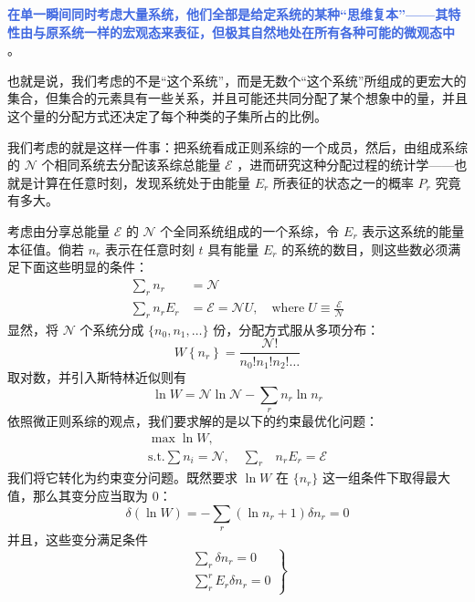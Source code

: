 \textcolor{RoyalBlue}{\textbf{\kaishu 在单一瞬间同时考虑大量系统，他们全部是给定系统的某种“思维复本”——其特性由与原系统一样的宏观态来表征，但极其自然地处在所有各种可能的微观态中}} \cite{Pathria}。

也就是说，我们考虑的不是“这个系统”，而是无数个“这个系统”所组成的更宏大的集合，但集合的元素具有一些关系，并且可能还共同分配了某个想象中的量，并且这个量的分配方式还决定了每个种类的子集所占的比例。

我们考虑的就是这样一件事：把系统看成正则系综的一个成员，然后，由组成系综的 $\mathcal{N}$ 个相同系统去分配该系综总能量 $\mathcal{E}$ ，进而研究这种分配过程的统计学——也就是计算在任意时刻，发现系统处于由能量 $E_r$ 所表征的状态之一的概率 $P_r$ 究竟有多大。

考虑由分享总能量 $\mathcal{E}$ 的 $\mathcal{N}$ 个全同系统组成的一个系综，令 $E_r$ 表示这系统的能量本征值。倘若 $n_r$ 表示在任意时刻 $t$ 具有能量 $E_r$ 的系统的数目，则这些数必须满足下面这些明显的条件：
\begin{align}
    \sum_r n_r&=\mathcal{N} \\
    \sum_r n_r E_r&=\mathcal{E}=\mathcal{N} U, \quad\text{where}\; U \equiv \frac{\mathcal{E}}{\mathcal{N}}  
\end{align}
显然，将 $\mathcal{N}$ 个系统分成 $\{n_0,n_1,\dots\}$ 份，分配方式服从多项分布：
\begin{equation}
    W\left\{n_r\right\}=\frac{\mathcal{N} !}{n_{0} ! n_{1} ! n_{2} ! \ldots}
\end{equation}
取对数，并引入斯特林近似则有
\begin{equation}
    \ln W=\mathcal{N} \ln \mathcal{N}-\sum_r n_r \ln n_r
\end{equation}
依照微正则系综的观点，我们要求解的是以下的约束最优化问题：
\begin{equation}\label{equ:optimizeIII}
    \begin{split}
        \max \ln W,&\\
        \text{s.t.}\sum n_i = \mathcal{N},\quad\sum_r &n_r E_r=\mathcal{E}
    \end{split}
\end{equation}
我们将它转化为约束变分问题。既然要求 $\ln W$ 在 $\{n_r\}$ 这一组条件下取得最大值，那么其变分应当取为 $0$：
\[
    \delta(\ln W)=-\sum_r\left(\ln n_r+1\right) \delta n_r = 0
\]
并且，这些变分满足条件
\[
    \left.\begin{array}{l}
        \sum_r \delta n_r=0 \\
        \sum_r^r E_r \delta n_r=0
        \end{array}\right\}
\]
